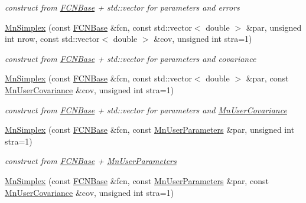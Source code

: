 \begin{DoxyCompactItemize}
\begin{DoxyCompactList}\small\item\em construct from \mbox{\hyperlink{classROOT_1_1Minuit2_1_1FCNBase}{F\+C\+N\+Base}} + std\+::vector for parameters and errors \end{DoxyCompactList}\item 
\mbox{\hyperlink{classROOT_1_1Minuit2_1_1MnSimplex_a7c7c4c6af82a37f75f574e80db9b4d08}{Mn\+Simplex}} (const \mbox{\hyperlink{classROOT_1_1Minuit2_1_1FCNBase}{F\+C\+N\+Base}} \&fcn, const std\+::vector$<$ double $>$ \&par, unsigned int nrow, const std\+::vector$<$ double $>$ \&cov, unsigned int stra=1)
\begin{DoxyCompactList}\small\item\em construct from \mbox{\hyperlink{classROOT_1_1Minuit2_1_1FCNBase}{F\+C\+N\+Base}} + std\+::vector for parameters and covariance \end{DoxyCompactList}\item 
\mbox{\hyperlink{classROOT_1_1Minuit2_1_1MnSimplex_ab97366c72fb0ab991cfcdaa6fb8dcb01}{Mn\+Simplex}} (const \mbox{\hyperlink{classROOT_1_1Minuit2_1_1FCNBase}{F\+C\+N\+Base}} \&fcn, const std\+::vector$<$ double $>$ \&par, const \mbox{\hyperlink{classROOT_1_1Minuit2_1_1MnUserCovariance}{Mn\+User\+Covariance}} \&cov, unsigned int stra=1)
\begin{DoxyCompactList}\small\item\em construct from \mbox{\hyperlink{classROOT_1_1Minuit2_1_1FCNBase}{F\+C\+N\+Base}} + std\+::vector for parameters and \mbox{\hyperlink{classROOT_1_1Minuit2_1_1MnUserCovariance}{Mn\+User\+Covariance}} \end{DoxyCompactList}\item 
\mbox{\hyperlink{classROOT_1_1Minuit2_1_1MnSimplex_ae306bac9f00c5b8d330ca4166620f75e}{Mn\+Simplex}} (const \mbox{\hyperlink{classROOT_1_1Minuit2_1_1FCNBase}{F\+C\+N\+Base}} \&fcn, const \mbox{\hyperlink{classROOT_1_1Minuit2_1_1MnUserParameters}{Mn\+User\+Parameters}} \&par, unsigned int stra=1)
\begin{DoxyCompactList}\small\item\em construct from \mbox{\hyperlink{classROOT_1_1Minuit2_1_1FCNBase}{F\+C\+N\+Base}} + \mbox{\hyperlink{classROOT_1_1Minuit2_1_1MnUserParameters}{Mn\+User\+Parameters}} \end{DoxyCompactList}\item 
\mbox{\hyperlink{classROOT_1_1Minuit2_1_1MnSimplex_a6583a53c38490030a1ff7fe80bdc69bc}{Mn\+Simplex}} (const \mbox{\hyperlink{classROOT_1_1Minuit2_1_1FCNBase}{F\+C\+N\+Base}} \&fcn, const \mbox{\hyperlink{classROOT_1_1Minuit2_1_1MnUserParameters}{Mn\+User\+Parameters}} \&par, const \mbox{\hyperlink{classROOT_1_1Minuit2_1_1MnUserCovariance}{Mn\+User\+Covariance}} \&cov, unsigned int stra=1)

\end{DoxyCompactItemize}
